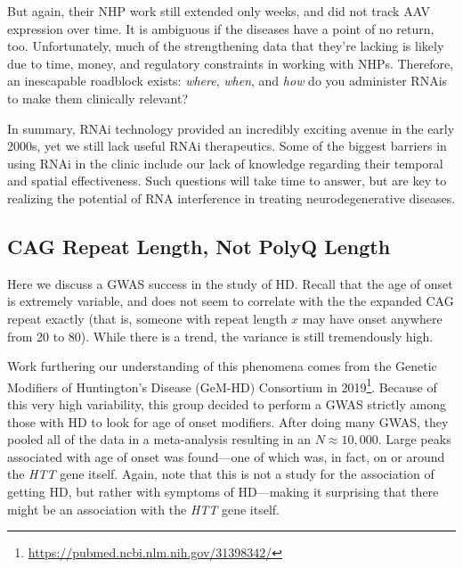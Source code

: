 But again, their NHP work still extended only weeks, and did not track AAV expression over time. It is ambiguous if the diseases have a point of no return, too. Unfortunately, much of the strengthening data that they're lacking is likely due to time, money, and regulatory constraints in working with NHPs. Therefore, an inescapable roadblock exists: \textit{where}, \textit{when}, and \textit{how} do you administer RNAis to make them clinically relevant?\newline


In summary, RNAi technology provided an incredibly exciting avenue in the early 2000s, yet we still lack useful RNAi therapeutics. Some of the biggest barriers in using RNAi in the clinic include our lack of knowledge regarding their temporal and spatial effectiveness. Such questions will take time to answer, but are key to realizing the potential of RNA interference in treating neurodegenerative diseases. 



\subsection*{CAG Repeat Length, Not PolyQ Length}

\label{sec:HDGWAS}

Here we discuss a GWAS success in the study of HD. Recall that the age of onset is extremely variable, and does not seem to correlate with the the expanded CAG repeat exactly (that is, someone with repeat length $x$ may have onset anywhere from 20 to 80). While there is a trend, the variance is still tremendously high.\newline

Work furthering our understanding of this phenomena comes from the Genetic Modifiers of Huntington's Disease (GeM-HD) Consortium in 2019\footnote{\url{https://pubmed.ncbi.nlm.nih.gov/31398342/}}. Because of this very high variability, this group decided to perform a GWAS strictly among those with HD to look for age of onset modifiers. After doing many GWAS, they pooled all of the data in a meta-analysis resulting in an $N \approx 10,000$. Large peaks associated with age of onset was found---one of which was, in fact, on or around the \textit{HTT} gene itself. Again, note that this is not a study for the association of getting HD, but rather with symptoms of HD---making it surprising that there might be an association with the \textit{HTT} gene itself.\newline

